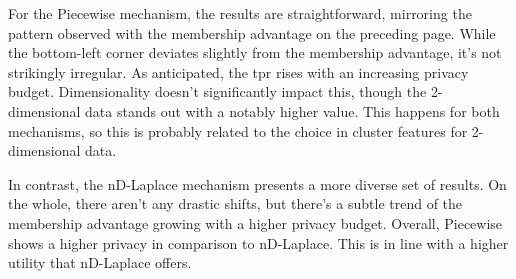 For the Piecewise mechanism, the results are straightforward, mirroring the pattern observed with the membership advantage on the preceding page. While the bottom-left corner deviates slightly from the membership advantage, it's not strikingly irregular. As anticipated, the \gls{tpr} rises with an increasing privacy budget. Dimensionality doesn't significantly impact this, though the 2-dimensional data stands out with a notably higher value.
This happens for both mechanisms, so this is probably related to the choice in cluster features for 2-dimensional data.

In contrast, the nD-Laplace mechanism presents a more diverse set of results. On the whole, there aren't any drastic shifts, but there's a subtle trend of the membership advantage growing with a higher privacy budget. %
Overall, Piecewise shows a higher privacy in comparison to nD-Laplace. This is in line with a higher utility that nD-Laplace offers.
\newpage

